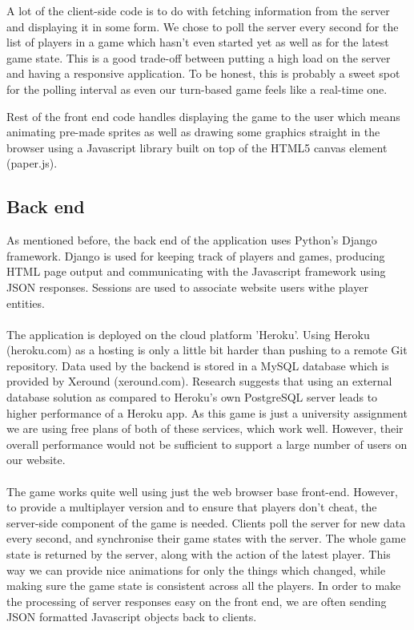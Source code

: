 \documentclass{article}
\begin{document}
A lot of the client-side code is to do with fetching information from the server and displaying it in some form. We chose to poll the server every second for the list of players in a game which hasn't even started yet as well as for the latest game state. This is a good trade-off between putting a high load on the server and having a responsive application. To be honest, this is probably a sweet spot for the polling interval as even our turn-based game feels like a real-time one.

Rest of the front end code handles displaying the game to the user which means animating pre-made sprites as well as drawing some graphics straight in the browser using a Javascript library built on top of the HTML5 canvas element (paper.js).

\subsection{Back end}
As mentioned before, the back end of the application uses Python's Django framework. Django is used for keeping track of players and games, producing HTML page output and communicating with the Javascript framework using JSON responses. Sessions are used to associate website users withe player entities. \\ \\
The application is deployed on the cloud platform 'Heroku'. Using Heroku (heroku.com) as a hosting is only a little bit harder than pushing to a remote Git repository. Data used by the backend is stored in a MySQL database which is provided by Xeround (xeround.com). Research suggests that using an external database solution as compared to Heroku's own PostgreSQL server leads to higher performance of a Heroku app. As this game is just a university assignment we are using free plans of both of these services, which work well. However, their overall performance would not be sufficient to support a large number of users on our website. \\ \\
The game works quite well using just the web browser base front-end. However, to provide a multiplayer version and to ensure that players don't cheat, the server-side component of the game is needed. Clients poll the server for new data every second, and synchronise their game states with the server. The whole game state is returned by the server, along with the action of the latest player. This way we can provide nice animations for only the things which changed, while making sure the game state is consistent across all the players. In order to make the processing of server responses easy on the front end, we are often sending JSON formatted Javascript objects back to clients. \\ \\
\end{document}

